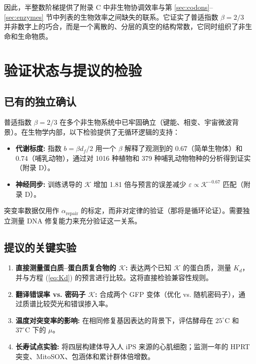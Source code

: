 \documentclass[12pt,a4paper]{article}
\newcommand{\REL}{\mathcal{K}}          %
\begin{document}
	因此，半整数阶梯提供了附录 C 中非生物协调效率与第 \ref{sec:codons}–\ref{sec:enzymes} 节中列表的生物效率之间缺失的联系。它证实了普适指数 \(\beta = 2/3\) 并非数字上的巧合，而是一个离散的、分层的真空的结构常数，它同时组织了非生命和生命物质。
	
	\section{验证状态与提议的检验}
	\label{sec:validation}
	
	\subsection{已有的独立确认}
	普适指数 \(\beta = 2/3\) 在多个非生物系统中已牢固确立（键能、相变、宇宙微波背景）。在生物学内部，以下检验提供了无循环逻辑的支持：
	\begin{itemize}
		\item \textbf{代谢标度:} 指数 \(b = \beta d_f/2\) 用一个 \(\beta\) 解释了观测到的 \(0.67\)（简单生物体）和 \(0.74\)（哺乳动物），通过对 1016 种植物和 379 种哺乳动物物种的分析得到证实（附录 D）。
		\item \textbf{神经同步:} 训练诱导的 \(\REL\) 增加 1.81 倍与预言的误差减少 \(\varepsilon \propto \REL^{-0.67}\) 匹配（附录 D）。
	\end{itemize}
	突变率数据仅用作 \(\alpha_{\mathrm{repair}}\) 的标定，而非对定律的验证（那将是循环论证）。需要独立测量 DNA 修复能力来充分验证这一关系。
	
	\subsection{提议的关键实验}
	\begin{enumerate}
		\item \textbf{直接测量蛋白质–蛋白质复合物的 \(\REL\):} 表达两个已知 \(\REL\) 的蛋白质，测量 \(K_d\)，并与方程 (\ref{eq:Kd}) 的预言进行比较。这将直接检验兼容性规则。
		\item \textbf{翻译错误率 vs. 密码子 \(\REL\):} 合成两个 GFP 变体（优化 vs. 随机密码子），通过质谱比较荧光和错误掺入率。
		\item \textbf{温度对突变率的影响:} 在相同修复基因表达的背景下，评估酵母在 \(25^\circ\text{C}\) 和 \(37^\circ\text{C}\) 下的 \(\mu\)。
		\item \textbf{长寿试点实验:} 将四层构建体导入人 iPS 来源的心肌细胞；监测一年的 HPRT 突变、MitoSOX、包涵体和累计群体倍增数。
	\end{enumerate}
	
\end{document}
